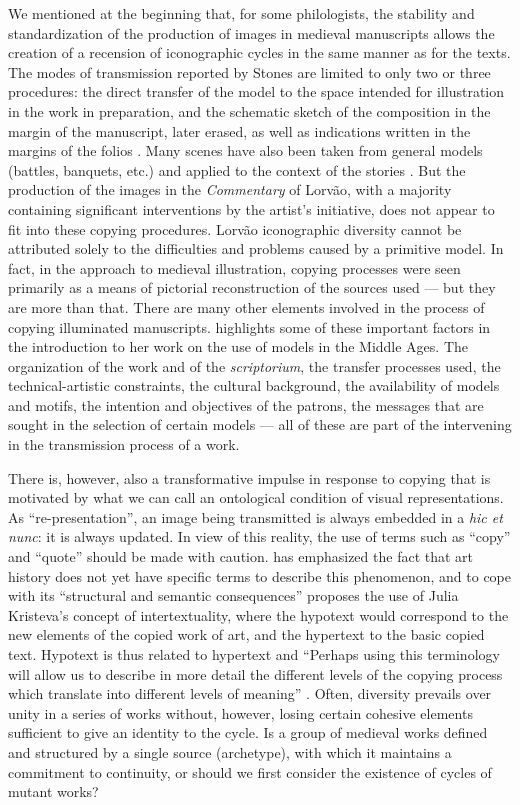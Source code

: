 \begin{paper}
We mentioned at the beginning that, for some philologists, the stability
and standardization of the production of images in medieval manuscripts
allows the creation of a recension of iconographic cycles in the same
manner as for the texts. The modes of transmission reported by Stones
are limited to only two or three procedures: the direct transfer of the
model to the space intended for illustration in the work in preparation,
and the schematic sketch of the composition in the margin of the
manuscript, later erased, as well as indications written in the margins
of the folios \citep[96]{stones_secular_1976}. Many scenes have also been taken from
general models (battles, banquets, etc.) and applied to the context of
the stories \citep{scheller_exemplum_1995}. But the production of the images in the
\emph{Commentary} of Lorvão, with a majority containing significant
interventions by the artist's initiative, does not appear to fit into
these copying procedures. Lorvão iconographic diversity cannot be
attributed solely to the difficulties and problems caused by a primitive
model. In fact, in the approach to medieval illustration, copying
processes were seen primarily as a means of pictorial reconstruction of
the sources used –– but they are more than that. There are many other
elements involved in the process of copying illuminated manuscripts. \citet{muller_use_2014} highlights some of these important factors in the
introduction to her work on the use of models in the Middle Ages. The
organization of the work and of the \emph{scriptorium}, the transfer
processes used, the technical-artistic constraints, the cultural
background, the availability of models and motifs, the intention and
objectives of the patrons, the messages that are sought in the selection
of certain models –– all of these are part of the intervening in the
transmission process of a work.

There is, however, also a transformative impulse in response to copying
that is motivated by what we can call an ontological condition of visual
representations. As ``re-presentation'', an image being transmitted is
always embedded in a \emph{hic et nunc}: it is always updated. In view
of this reality, the use of terms such as ``copy'' and ``quote'' should
be made with caution. \citet{muller_use_2014} has emphasized the fact that art
history does not yet have specific terms to describe this phenomenon,
and to cope with its ``structural and semantic consequences'' proposes
the use of Julia Kristeva's concept of intertextuality, where the
hypotext would correspond to the new elements of the copied work of art,
and the hypertext to the basic copied text. Hypotext is thus related to
hypertext and ``Perhaps using this terminology will allow us to describe
in more detail the different levels of the copying process which
translate into different levels of meaning'' \citep[xxvi]{muller_use_2014}. Often,
diversity prevails over unity in a series of works without, however,
losing certain cohesive elements sufficient to give an identity to the
cycle. Is a group of medieval works defined and structured by a single
source (archetype), with which it maintains a commitment to continuity,
or should we first consider the existence of cycles of mutant works?


\end{paper}
